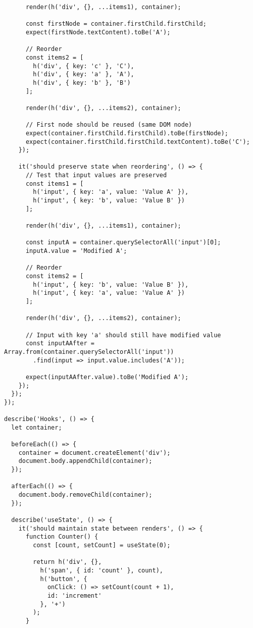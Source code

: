 \documentclass[11pt]{article}
\begin{document}
\begin{verbatim}
      render(h('div', {}, ...items1), container);
      
      const firstNode = container.firstChild.firstChild;
      expect(firstNode.textContent).toBe('A');
      
      // Reorder
      const items2 = [
        h('div', { key: 'c' }, 'C'),
        h('div', { key: 'a' }, 'A'),
        h('div', { key: 'b' }, 'B')
      ];
      
      render(h('div', {}, ...items2), container);
      
      // First node should be reused (same DOM node)
      expect(container.firstChild.firstChild).toBe(firstNode);
      expect(container.firstChild.firstChild.textContent).toBe('C');
    });
    
    it('should preserve state when reordering', () => {
      // Test that input values are preserved
      const items1 = [
        h('input', { key: 'a', value: 'Value A' }),
        h('input', { key: 'b', value: 'Value B' })
      ];
      
      render(h('div', {}, ...items1), container);
      
      const inputA = container.querySelectorAll('input')[0];
      inputA.value = 'Modified A';
      
      // Reorder
      const items2 = [
        h('input', { key: 'b', value: 'Value B' }),
        h('input', { key: 'a', value: 'Value A' })
      ];
      
      render(h('div', {}, ...items2), container);
      
      // Input with key 'a' should still have modified value
      const inputAAfter = Array.from(container.querySelectorAll('input'))
        .find(input => input.value.includes('A'));
      
      expect(inputAAfter.value).toBe('Modified A');
    });
  });
});

describe('Hooks', () => {
  let container;
  
  beforeEach(() => {
    container = document.createElement('div');
    document.body.appendChild(container);
  });
  
  afterEach(() => {
    document.body.removeChild(container);
  });
  
  describe('useState', () => {
    it('should maintain state between renders', () => {
      function Counter() {
        const [count, setCount] = useState(0);
        
        return h('div', {},
          h('span', { id: 'count' }, count),
          h('button', {
            onClick: () => setCount(count + 1),
            id: 'increment'
          }, '+')
        );
      }
      

\end{verbatim}
\end{document}
